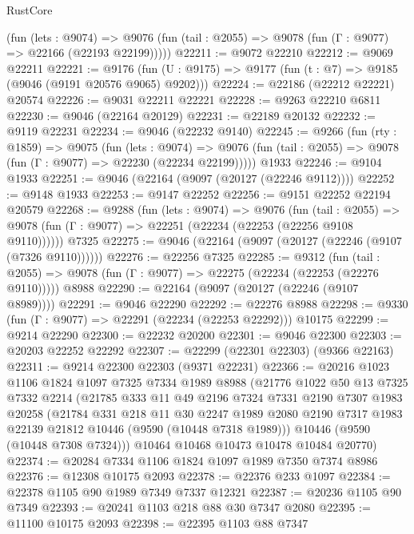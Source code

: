 \begin{lexlean}{RustCore}
\begin{coremodule}
      (fun (lets : @9074) =>
      @9076 (fun (tail : @2055) => @9078 (fun (Γ : @9077) => @22166 (@22193 @22199)))))
@22211 := @9072 @22210
@22212 := @9069 @22211
@22221 := @9176
    (fun (U : @9175) => @9177 (fun (t : @7) => @9185 (@9046 (@9191 @20576 @9065) @9202)))
@22224 := @22186 (@22212 @22221) @20574
@22226 := @9031 @22211 @22221
@22228 := @9263 @22210 @6811
@22230 := @9046 (@22164 @20129)
@22231 := @22189 @20132
@22232 := @9119 @22231
@22234 := @9046 (@22232 @9140)
@22245 := @9266
    (fun (rty : @1859) =>
    @9075
      (fun (lets : @9074) =>
      @9076 (fun (tail : @2055) => @9078 (fun (Γ : @9077) => @22230 (@22234 @22199)))))
    @1933
@22246 := @9104 @1933
@22251 := @9046 (@22164 (@9097 (@20127 (@22246 @9112))))
@22252 := @9148 @1933
@22253 := @9147 @22252
@22256 := @9151 @22252 @22194 @20579
@22268 := @9288
    (fun (lets : @9074) =>
    @9076
      (fun (tail : @2055) =>
      @9078 (fun (Γ : @9077) => @22251 (@22234 (@22253 (@22256 @9108 @9110))))))
    @7325
@22275 := @9046 (@22164 (@9097 (@20127 (@22246 (@9107 (@7326 @9110))))))
@22276 := @22256 @7325
@22285 := @9312
    (fun (tail : @2055) => @9078 (fun (Γ : @9077) => @22275 (@22234 (@22253 (@22276 @9110)))))
    @8988
@22290 := @22164 (@9097 (@20127 (@22246 (@9107 @8989))))
@22291 := @9046 @22290
@22292 := @22276 @8988
@22298 := @9330 (fun (Γ : @9077) => @22291 (@22234 (@22253 @22292))) @10175
@22299 := @9214 @22290
@22300 := @22232 @20200
@22301 := @9046 @22300
@22303 := @20203 @22252 @22292
@22307 := @22299 (@22301 @22303) (@9366 @22163)
@22311 := @9214 @22300 @22303 (@9371 @22231)
@22366 := @20216
    @1023
    @1106
    @1824
    @1097
    @7325
    @7334
    @1989
    @8988
    (@21776
      @1022
      @50
      @13
      @7325
      @7332
      @2214
      (@21785
        @333
        @11
        @49
        @2196
        @7324
        @7331
        @2190
        @7307
        @1983
        @20258
        (@21784
          @331
          @218
          @11
          @30
          @2247
          @1989
          @2080
          @2190
          @7317
          @1983
          @22139
          @21812
          @10446
          (@9590 (@10448 @7318 @1989)))
        @10446
        (@9590 (@10448 @7308 @7324)))
      @10464
      @10468
      @10473
      @10478
      @10484
      @20770)
@22374 := @20284 @7334 @1106 @1824 @1097 @1989 @7350 @7374 @8986
@22376 := @12308 @10175 @2093
@22378 := @22376 @233 @1097
@22384 := @22378 @1105 @90 @1989 @7349 @7337 @12321
@22387 := @20236 @1105 @90 @7349
@22393 := @20241 @1103 @218 @88 @30 @7347 @2080
@22395 := @11100 @10175 @2093
@22398 := @22395 @1103 @88 @7347

\end{coremodule}
\end{lexlean}
